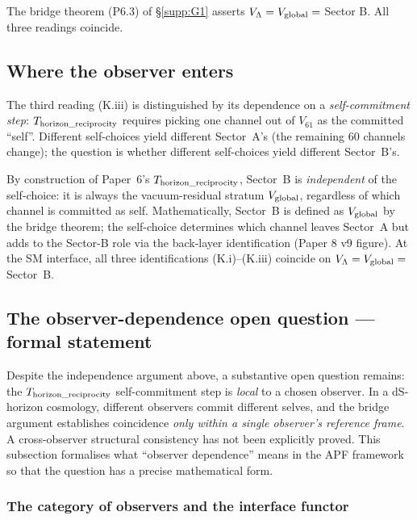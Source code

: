 \documentclass[11pt]{article}
\theoremstyle{plain}
\theoremstyle{definition}
\theoremstyle{remark}
\begin{document}
The bridge theorem (P6.3) of \S\ref{supp:G1} asserts $V_\Lambda = V_{\rm global} = $ Sector B.  All three readings coincide.

\subsection{Where the observer enters}\label{supp:K2}

The third reading (K.iii) is distinguished by its dependence on a \emph{self-commitment step}: $T_{\rm horizon\_reciprocity}$ requires picking one channel out of $V_{61}$ as the committed ``self''.  Different self-choices yield different Sector~A's (the remaining 60 channels change); the question is whether different self-choices yield different Sector~B's.

By construction of Paper~6's $T_{\rm horizon\_reciprocity}$, Sector~B is \emph{independent} of the self-choice: it is always the vacuum-residual stratum $V_{\rm global}$, regardless of which channel is committed as self.  Mathematically, Sector~B is defined as $V_{\rm global}$ by the bridge theorem; the self-choice determines which channel leaves Sector~A but adds to the Sector-B role via the back-layer identification (Paper 8 v9 figure).  At the SM interface, all three identifications (K.i)--(K.iii) coincide on $V_\Lambda = V_{\rm global} = $ Sector~B.

\subsection{The observer-dependence open question --- formal statement}\label{supp:K3}

Despite the independence argument above, a substantive open question remains: the $T_{\rm horizon\_reciprocity}$ self-commitment step is \emph{local} to a chosen observer.  In a dS-horizon cosmology, different observers commit different selves, and the bridge argument establishes coincidence \emph{only within a single observer's reference frame}.  A cross-observer structural consistency has not been explicitly proved.  This subsection formalises what ``observer dependence'' means in the APF framework so that the question has a precise mathematical form.

\subsubsection*{The category of observers and the interface functor}
\end{document}
